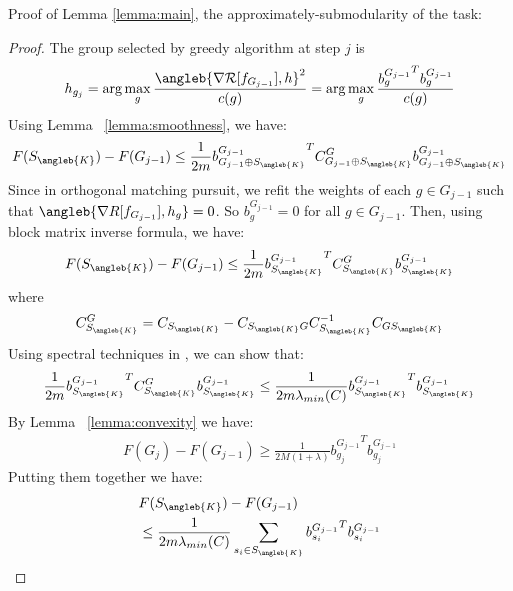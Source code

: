 Proof of Lemma \ref{lemma:main}, the approximately-submodularity of the task:
\begin{proof}
  The group selected by greedy algorithm at step $j$ is 
  \begin{align*}
    h_{g_j} = \arg \max _ {g} \frac{ 
        \angleb{ \nabla \mathcal{R}[ f_{G_{j-1}}] , h } ^2 }
        { c(g) }
      = \arg \max _{g} \frac{ {b^{G_{j-1}}_g}^T b^{G_{j-1}}_g } { c(g) }
  \end{align*}
  Using Lemma ~\ref{lemma:smoothness}, we have: 
  \begin{align*}
    F(S_{\angleb{K}}) - F(G_{j-1}) \leq 
      \frac{1}{2m} {b^{G_{j-1}}_{G_{j-1} \oplus S_{\angleb{K}}}}^T
      C^G_{G_{j-1} \oplus S_{\angleb{K}}} b^{G_{j-1}}_{G_{j-1} \oplus S_{\angleb{K}}}
  \end{align*}
  Since in orthogonal matching pursuit, we refit the weights of each $g \in G_{j-1}$ such
  that $\angleb{\nabla R[ f_{G_{j-1}}], h_g} = 0$. 
  So $b^{G_{j-1}}_{g} = 0$ for all $g \in G_{j-1}$. Then, using block matrix inverse
  formula, we have:
  \begin{align*}
    F(S_{\angleb{K}}) - F(G_{j-1}) \leq 
      \frac{1}{2m} 
      {b^{G_{j-1}}_{S_{\angleb{K}}}}^T
      C^G_{S_{\angleb{K}}} 
      b^{G_{j-1}}_{S_{\angleb{K}}}
  \end{align*}
  where 
  \begin{align*}
    C^G_{S_{\angleb{K}}} = C_{S_{\angleb{K}}} - C_{{S_{\angleb{K}}}G} 
      C^{-1}_{S_{\angleb{K}}} C_{G{S_{\angleb{K}}}}  
  \end{align*}
  Using spectral techniques in \cite{kemp}, we can show that:
  \begin{align*}
      \frac{1}{2m} 
      {b^{G_{j-1}}_{S_{\angleb{K}}}}^T
      C^G_{S_{\angleb{K}}} 
      b^{G_{j-1}}_{S_{\angleb{K}}}
    \leq 
      \frac{1}{2m \lambda_{min}(C)} 
      {b^{G_{j-1}}_{S_{\angleb{K}}}}^T
      b^{G_{j-1}}_{S_{\angleb{K}}}
  \end{align*}
  By Lemma ~\ref{lemma:convexity} we have:
  \begin{align*}
      F(G_j) - F(G_{j-1}) \geq \frac{1}{2M (1+ \lambda)} 
        {b^{G_{j-1}}_{g_j}}^Tb^{G_{j-1}}_{g_j}
  \end{align*}
  Putting them together we have:
  \begin{align*}
        &F(S_{\angleb{K}}) - F(G_{j-1}) \\
    &\leq 
        \frac{1}{2m\lambda_{min}(C)} \sum _{s_i \in S_{\angleb{K}}} 
        {b^{G_{j-1}}_{s_i}}^T{b^{G_{j-1}}_{s_i}} \\

\end{align*}
\end{proof}
